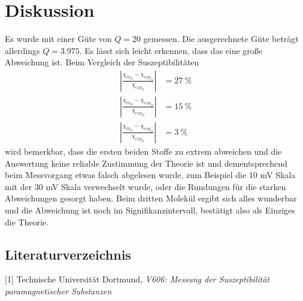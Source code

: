 \documentclass[a4paper]{scrartcl}
\begin{document}
\section{Diskussion}
Es wurde mit einer Güte von $Q=20$ gemessen. Die ausgerechnete Güte beträgt allerdings $Q=3.975$. Es lässt sich leicht erkennen, dass das eine große Abweichung ist. 
Beim Vergleich der Suszeptibilitäten 
\begin{align*}
  |\frac{\chi_{th_{N}}-\chi_{exp_{N}}}{\chi_{exp_{N}}}|&=27\ \%\\
  |\frac{\chi_{th_{D}}-\chi_{exp_{D}}}{\chi_{exp_{D}}}|&=15\ \%\\
  |\frac{\chi_{th_{G}}-\chi_{exp_{G}}}{\chi_{exp_{G}}}|&=3\ \%
\end{align*}
wird bemerkbar, dass die ersten beiden Stoffe zu extrem abweichen und die Auswertung keine reliable Zustimmung der Theorie ist und dementsprechend beim Messvorgang etwas falsch abgelesen wurde, zum Beispiel die 10 mV Skala mit der 30 mV Skala verwechselt wurde, oder die Rundungen für die starken Abweichungen gesorgt haben. Beim dritten Molekül ergibt sich alles wunderbar und die Abweichung ist noch im Signifikanzintervall, bestätigt also als Einziges die Theorie. 

\subsection{Literaturverzeichnis}

[1] Technische Universität Dortmund, \textit{V606: Messung der Suszeptibilität paramagnetischer
Substanzen}
\end{document}
